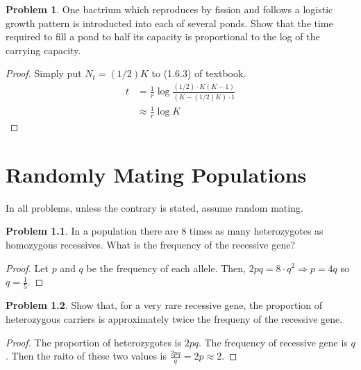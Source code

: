 \documentclass[12pt]{report}
\theoremstyle{definition}
\newtheorem{problem}{Problem}[chapter]
\begin{document}
        \begin{problem}
            One bactrium which reproduces by fission and follows a logistic growth pattern is introducted into each of several ponds.
            Show that the time required to fill a pond to half its capacity is proportional to the log of the carrying capacity.
            \begin{proof}
                Simply put $N_t=(1/2)K$ to (1.6.3) of textbook.
               \begin{equation*}
                   \begin{split}
                       t &= \frac{1}{r} \log \frac{(1/2)\cdot K(K-1)}{(K-(1/2)K)\cdot 1} \\
                         &\approx \frac{1}{r} \log{K}
                   \end{split}
               \end{equation*}

            \end{proof}
        \end{problem}

        \newpage

        \chapter{Randomly Mating Populations}
        In all problems, unless the contrary is stated, assume random mating.
        \begin{problem}
            In a population there are 8 times as many heterozygotes as homozygous recessives. 
            What is the frequency of the recessive gene?
            \begin{proof}
                Let $p$ and $q$ be the frequency of each allele.
                Then, $2pq = 8 \cdot q^2 \Rightarrow p=4q$ so $q=\frac{1}{5}$.
            \end{proof}
        \end{problem}

        \begin{problem}
            Show that, for a very rare recessive gene, the proportion of heterozygous carriers is approximately twice the frequeny of the recessive gene.
            \begin{proof}
                The proportion of heterozygotes is $2pq$. The frequency of recessive gene is $q$.
                Then the raito of these two values is $\frac{2pq}{q} = 2p \approx 2$.
            \end{proof}                
        \end{problem}
\end{document}
